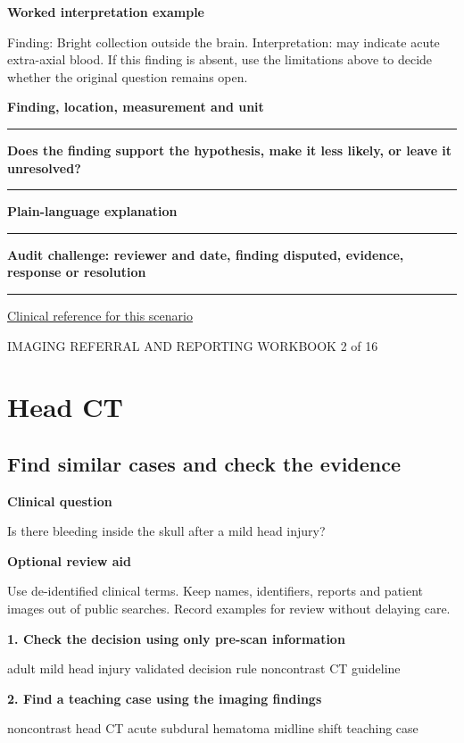 \documentclass[11pt,a4paper]{article}
\newcommand{\record}[1]{\textbf{#1}\par\vspace{0.55\baselineskip}\hrule\vspace{0.35\baselineskip}}
\begin{document}
\textbf{Worked interpretation example}\par Finding: Bright collection outside the brain. Interpretation: may indicate acute extra-axial blood. If this finding is absent, use the limitations above to decide whether the original question remains open.\par

\record{Finding, location, measurement and unit}

\record{Does the finding support the hypothesis, make it less likely, or leave it unresolved?}

\record{Plain-language explanation}

\record{Audit challenge: reviewer and date, finding disputed, evidence, response or resolution}

\small\href{https://acsearch.acr.org/docs/69481/Narrative}{Clinical reference for this scenario}

\normalsize

\newpage

{\small IMAGING REFERRAL AND REPORTING WORKBOOK \hfill 2 of 16}

\section*{Head CT}

\subsection*{Find similar cases and check the evidence}

\textbf{Clinical question}\par Is there bleeding inside the skull after a mild head injury?\par

\textbf{Optional review aid}\par Use de-identified clinical terms. Keep names, identifiers, reports and patient images out of public searches. Record examples for review without delaying care.\par

\textbf{1. Check the decision using only pre-scan information}\par adult mild head injury validated decision rule noncontrast CT guideline\par

\textbf{2. Find a teaching case using the imaging findings}\par noncontrast head CT acute subdural hematoma midline shift teaching case\par
\end{document}
